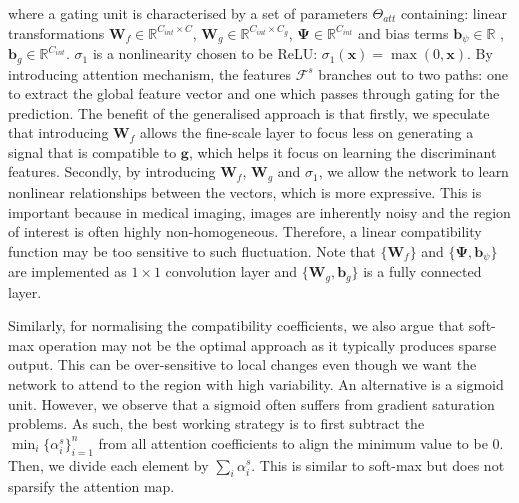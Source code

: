 \documentclass{article}
\providecommand{\mb}[1]{\mathbf{#1}}
\providecommand{\mbb}[1]{\boldsymbol{#1}}
\begin{document}
where a gating unit is characterised by a set of parameters $\Theta_{att}$ containing: linear transformations $\mb{W}_f \in \mathbb{R}^{C_{int} \times C}$, $\mb{W}_g \in  \mathbb{R}^{C_{int} \times C_{g}}$, $\mbb{\Psi} \in \mathbb{R}^{C_{int} }$ and bias terms $\mb{b}_{\psi} \in \mathbb{R}$ , $\mb{b}_{g} \in \mathbb{R}^{C_{int}}$. $\sigma_1$ is a nonlinearity chosen to be ReLU: $\sigma_1(\mb{x}) = \max (0, \mb{x})$. By introducing attention mechanism, the features $\mathcal{F}^s$ branches out to two paths: one to extract the global feature vector and one which passes through gating for the prediction. The benefit of the generalised approach is that firstly, we speculate that introducing $\mb{W}_f$ allows the fine-scale layer to focus less on generating a signal that is compatible to $\mb{g}$, which helps it focus on learning the discriminant features. Secondly, by introducing $\mb{W}_f$, $\mb{W}_g$ and $\sigma_1$, we allow the network to learn nonlinear relationships between the vectors, which is more expressive. This is important because in medical imaging, images are inherently noisy and the region of interest is often highly non-homogeneous. Therefore, a linear compatibility function may be too sensitive to such fluctuation. Note that $\{\mb{W}_f\}$ and $\{\mbb{\Psi}, \mb{b}_\psi\}$ are implemented as $1 \times 1$ convolution layer and $\{\mb{W}_g, \mb{b}_g\}$ is a fully connected layer.

Similarly, for normalising the compatibility coefficients, we also argue that soft-max operation may not be the optimal approach as it typically produces sparse output. This can be over-sensitive to local changes even though we want the network to attend to the region with high variability. An alternative is a sigmoid unit. However, we observe that a sigmoid often suffers from gradient saturation problems. As such, the best working strategy is to first subtract the $\min_i \{ \alpha_i^s\}_{i=1}^n$ from all attention coefficients to align the minimum value to be 0. Then, we divide each element by $\sum_i \alpha_i^s$. This is similar to soft-max but does not sparsify the attention map.
\end{document}
